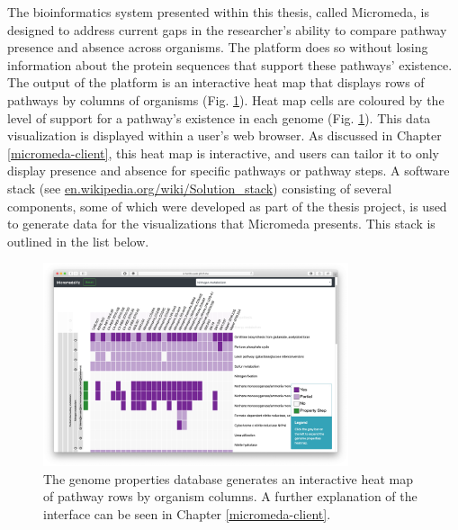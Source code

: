 The bioinformatics system presented within this thesis, called Micromeda, is designed to address current gaps in the researcher's ability to compare pathway presence and absence across organisms. The platform does so without losing information about the protein sequences that support these pathways' existence. The output of the platform is an interactive heat map that displays rows of pathways by columns of organisms (Fig. \ref{fig:basic-heatmap-overview}). Heat map cells are coloured by the level of support for a pathway's existence in each genome (Fig. \ref{fig:basic-heatmap-overview}). This data visualization is displayed within a user's web browser. As discussed in Chapter \ref{micromeda-client}, this heat map is interactive, and users can tailor it to only display presence and absence for specific pathways or pathway steps. A software stack (see \href{en.wikipedia.org/wiki/Solution\_stack}{en.wikipedia.org/wiki/Solution\_stack}) consisting of several components, some of which were developed as part of the thesis project, is used to generate data for the visualizations that Micromeda presents. This stack is outlined in the list below.

\begin{figure}[!ht]
  \centering
	\includegraphics[width=0.8\textwidth]{media/Micromeda-Simple-Overview.png}
	 \caption{The genome properties database generates an interactive heat map of pathway rows by organism columns. A further explanation of the interface can be seen in Chapter \ref{micromeda-client}.}
	 \label{fig:basic-heatmap-overview}
\end{figure}

